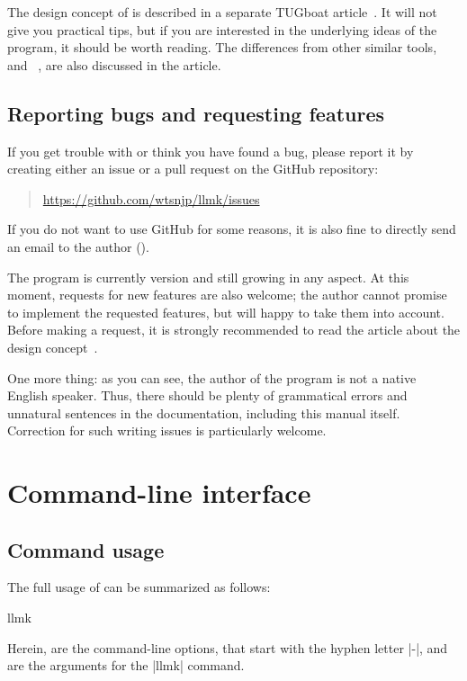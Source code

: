 \documentclass[draft]{llmk-doc}
\begin{document}
The design concept of  is described in a separate TUGboat
article~\cite{asakura2020}. It will not give you practical tips, but if you are
interested in the underlying ideas of the program, it should be worth reading.
The differences from other similar tools, \eg{}~\cite{latexmk} and
~\cite{arara}, are also discussed in the article.

\subsection{Reporting bugs and requesting features}

If you get trouble with  or think you have found a bug, please
report it by creating either an issue or a pull request on the GitHub
repository:
%
\begin{quote}
\url{https://github.com/wtsnjp/llmk/issues}
\end{quote}
%
If you do not want to use GitHub for some reasons, it is also fine to directly
send an email to the author ().

The  program is currently version  and still growing in
any aspect. At this moment, requests for new features are also welcome; the
author cannot promise to implement the requested features, but will happy to
take them into account. Before making a request, it is strongly recommended to
read the article about the design concept~\cite{asakura2020}.

One more thing: as you can see, the author of the program is not a native
English speaker. Thus, there should be plenty of grammatical errors and
unnatural sentences in the documentation, including this manual itself.
Correction for such writing issues is particularly welcome.

\section{Command-line interface}

\subsection{Command usage}

The full usage of  can be summarized as follows:
%
\begin{htcode}
llmk  
\end{htcode}

Herein,  are the command-line options, that start with the hyphen
letter |-|, and  are the arguments for the |llmk| command.
\end{document}
